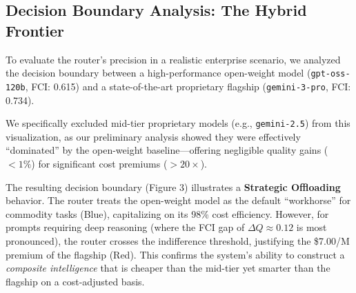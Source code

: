\subsection{Decision Boundary Analysis: The Hybrid Frontier}
To evaluate the router's precision in a realistic enterprise scenario, we analyzed the decision boundary between a high-performance open-weight model (\texttt{gpt-oss-120b}, FCI: 0.615) and a state-of-the-art proprietary flagship (\texttt{gemini-3-pro}, FCI: 0.734).

We specifically excluded mid-tier proprietary models (e.g., \texttt{gemini-2.5}) from this visualization, as our preliminary analysis showed they were effectively ``dominated'' by the open-weight baseline—offering negligible quality gains ($<1\%$) for significant cost premiums ($>20\times$).

The resulting decision boundary (Figure 3) illustrates a \textbf{Strategic Offloading} behavior. The router treats the open-weight model as the default ``workhorse'' for commodity tasks (Blue), capitalizing on its 98\% cost efficiency. However, for prompts requiring deep reasoning (where the FCI gap of $\Delta Q \approx 0.12$ is most pronounced), the router crosses the indifference threshold, justifying the \$7.00/M premium of the flagship (Red). This confirms the system's ability to construct a \textit{composite intelligence} that is cheaper than the mid-tier yet smarter than the flagship on a cost-adjusted basis.

